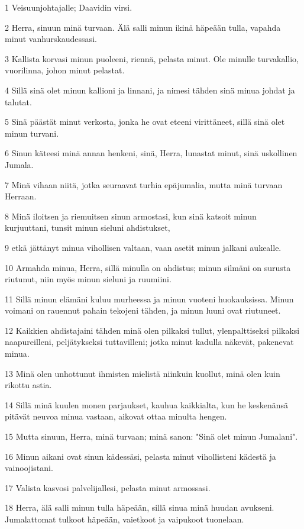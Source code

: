 \par 1 Veisuunjohtajalle; Daavidin virsi.
\par 2 Herra, sinuun minä turvaan. Älä salli minun ikinä häpeään tulla, vapahda minut vanhurskaudessasi.
\par 3 Kallista korvasi minun puoleeni, riennä, pelasta minut. Ole minulle turvakallio, vuorilinna, johon minut pelastat.
\par 4 Sillä sinä olet minun kallioni ja linnani, ja nimesi tähden sinä minua johdat ja talutat.
\par 5 Sinä päästät minut verkosta, jonka he ovat eteeni virittäneet, sillä sinä olet minun turvani.
\par 6 Sinun käteesi minä annan henkeni, sinä, Herra, lunastat minut, sinä uskollinen Jumala.
\par 7 Minä vihaan niitä, jotka seuraavat turhia epäjumalia, mutta minä turvaan Herraan.
\par 8 Minä iloitsen ja riemuitsen sinun armostasi, kun sinä katsoit minun kurjuuttani, tunsit minun sieluni ahdistukset,
\par 9 etkä jättänyt minua vihollisen valtaan, vaan asetit minun jalkani aukealle.
\par 10 Armahda minua, Herra, sillä minulla on ahdistus; minun silmäni on surusta riutunut, niin myös minun sieluni ja ruumiini.
\par 11 Sillä minun elämäni kuluu murheessa ja minun vuoteni huokauksissa. Minun voimani on rauennut pahain tekojeni tähden, ja minun luuni ovat riutuneet.
\par 12 Kaikkien ahdistajaini tähden minä olen pilkaksi tullut, ylenpalttiseksi pilkaksi naapureilleni, peljätykseksi tuttavilleni; jotka minut kadulla näkevät, pakenevat minua.
\par 13 Minä olen unhottunut ihmisten mielistä niinkuin kuollut, minä olen kuin rikottu astia.
\par 14 Sillä minä kuulen monen parjaukset, kauhua kaikkialta, kun he keskenänsä pitävät neuvoa minua vastaan, aikovat ottaa minulta hengen.
\par 15 Mutta sinuun, Herra, minä turvaan; minä sanon: "Sinä olet minun Jumalani".
\par 16 Minun aikani ovat sinun kädessäsi, pelasta minut vihollisteni kädestä ja vainoojistani.
\par 17 Valista kasvosi palvelijallesi, pelasta minut armossasi.
\par 18 Herra, älä salli minun tulla häpeään, sillä sinua minä huudan avukseni. Jumalattomat tulkoot häpeään, vaietkoot ja vaipukoot tuonelaan.
